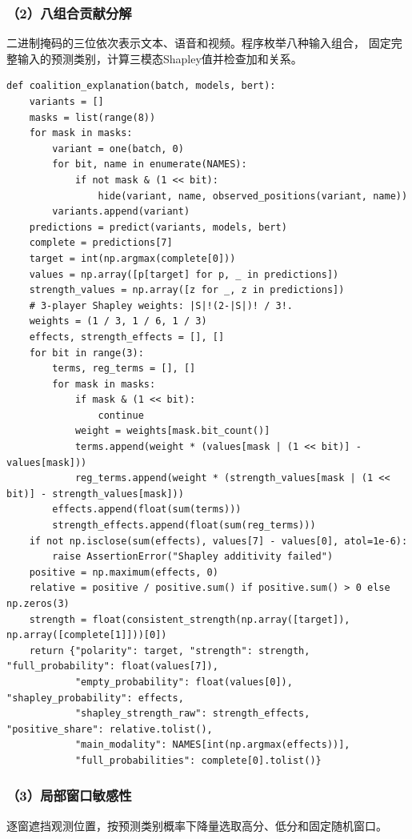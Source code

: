 \subsubsection*{（2）八组合贡献分解}
二进制掩码的三位依次表示文本、语音和视频。程序枚举八种输入组合，
固定完整输入的预测类别，计算三模态Shapley值并检查加和关系。

\begin{lstlisting}
def coalition_explanation(batch, models, bert):
    variants = []
    masks = list(range(8))
    for mask in masks:
        variant = one(batch, 0)
        for bit, name in enumerate(NAMES):
            if not mask & (1 << bit):
                hide(variant, name, observed_positions(variant, name))
        variants.append(variant)
    predictions = predict(variants, models, bert)
    complete = predictions[7]
    target = int(np.argmax(complete[0]))
    values = np.array([p[target] for p, _ in predictions])
    strength_values = np.array([z for _, z in predictions])
    # 3-player Shapley weights: |S|!(2-|S|)! / 3!.
    weights = (1 / 3, 1 / 6, 1 / 3)
    effects, strength_effects = [], []
    for bit in range(3):
        terms, reg_terms = [], []
        for mask in masks:
            if mask & (1 << bit):
                continue
            weight = weights[mask.bit_count()]
            terms.append(weight * (values[mask | (1 << bit)] - values[mask]))
            reg_terms.append(weight * (strength_values[mask | (1 << bit)] - strength_values[mask]))
        effects.append(float(sum(terms)))
        strength_effects.append(float(sum(reg_terms)))
    if not np.isclose(sum(effects), values[7] - values[0], atol=1e-6):
        raise AssertionError("Shapley additivity failed")
    positive = np.maximum(effects, 0)
    relative = positive / positive.sum() if positive.sum() > 0 else np.zeros(3)
    strength = float(consistent_strength(np.array([target]), np.array([complete[1]]))[0])
    return {"polarity": target, "strength": strength, "full_probability": float(values[7]),
            "empty_probability": float(values[0]), "shapley_probability": effects,
            "shapley_strength_raw": strength_effects, "positive_share": relative.tolist(),
            "main_modality": NAMES[int(np.argmax(effects))],
            "full_probabilities": complete[0].tolist()}
\end{lstlisting}

\subsubsection*{（3）局部窗口敏感性}
逐窗遮挡观测位置，按预测类别概率下降量选取高分、低分和固定随机窗口。

